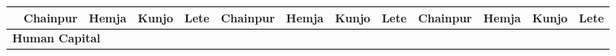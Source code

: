\begin{landscape}
\begin{table}[ht]
{\begin{tabular}{lcccccccccccc}
				& \textbf{Chainpur}                                             & \textbf{Hemja}                                                & \textbf{Kunjo}                                                 & \textbf{Lete}                                                  & \textbf{Chainpur}                                             & \textbf{Hemja}                                                & \textbf{Kunjo}                                                 & \textbf{Lete}                                                  & \textbf{Chainpur}                                             & \textbf{Hemja}                                                & \textbf{Kunjo}                                                 & \textbf{Lete}                                                  \\ \hline
				\multicolumn{13}{l}{\textbf{Human Capital}}                                                                                                                                                                                                                                                                                                                                                                                                                                                                                                                                                                                                                                                                                                                                                                                                                                                     \\

\end{tabular}}
\end{table}
\end{landscape}
